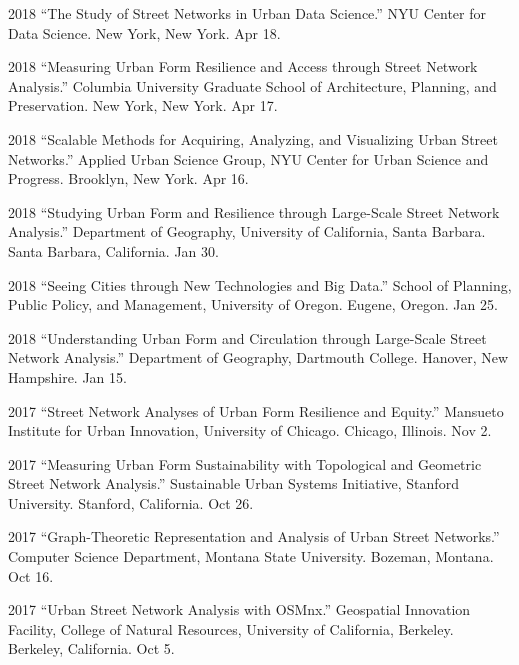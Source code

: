 \documentclass{academiccv}
\begin{document}
\begin{tablist}

\item[2018] \tab \enquote{The Study of Street Networks in Urban Data Science.} NYU Center for Data Science. New York, New York. Apr 18.

\item[2018] \tab \enquote{Measuring Urban Form Resilience and Access through Street Network Analysis.} Columbia University Graduate School of Architecture, Planning, and Preservation. New York, New York. Apr 17.

\item[2018] \tab \enquote{Scalable Methods for Acquiring, Analyzing, and Visualizing Urban Street Networks.} Applied Urban Science Group, NYU Center for Urban Science and Progress. Brooklyn, New York. Apr 16.

\item[2018] \tab \enquote{Studying Urban Form and Resilience through Large-Scale Street Network Analysis.} Department of Geography, University of California, Santa Barbara. Santa Barbara, California. Jan 30.

\item[2018] \tab \enquote{Seeing Cities through New Technologies and Big Data.} School of Planning, Public Policy, and Management, University of Oregon. Eugene, Oregon. Jan 25.

\item[2018] \tab \enquote{Understanding Urban Form and Circulation through Large-Scale Street Network Analysis.} Department of Geography, Dartmouth College. Hanover, New Hampshire. Jan 15.

\item[2017] \tab \enquote{Street Network Analyses of Urban Form Resilience and Equity.} Mansueto Institute for Urban Innovation, University of Chicago. Chicago, Illinois. Nov 2.

\item[2017] \tab \enquote{Measuring Urban Form Sustainability with Topological and Geometric Street Network Analysis.} Sustainable Urban Systems Initiative, Stanford University. Stanford, California. Oct 26.

\item[2017] \tab \enquote{Graph-Theoretic Representation and Analysis of Urban Street Networks.} Computer Science Department, Montana State University. Bozeman, Montana. Oct 16.

\item[2017] \tab \enquote{Urban Street Network Analysis with OSMnx.} Geospatial Innovation Facility, College of Natural Resources, University of California, Berkeley. Berkeley, California. Oct 5.


\end{tablist}
\end{document}
